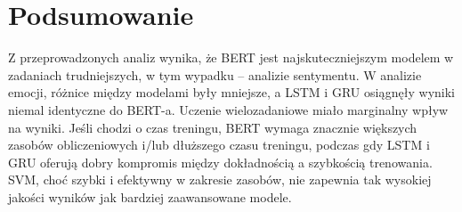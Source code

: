 \section{Podsumowanie}
Z przeprowadzonych analiz wynika, że BERT jest najskuteczniejszym modelem w zadaniach trudniejszych, w tym wypadku – analizie sentymentu. W analizie emocji, różnice między modelami były mniejsze, a LSTM i GRU osiągnęły wyniki niemal identyczne do BERT-a. Uczenie wielozadaniowe miało marginalny wpływ na wyniki. Jeśli chodzi o czas treningu, BERT wymaga znacznie większych zasobów obliczeniowych i/lub dłuższego czasu treningu, podczas gdy LSTM i GRU oferują dobry kompromis między dokładnością a szybkością trenowania. SVM, choć szybki i efektywny w zakresie zasobów, nie zapewnia tak wysokiej jakości wyników jak bardziej zaawansowane modele.

\endinput